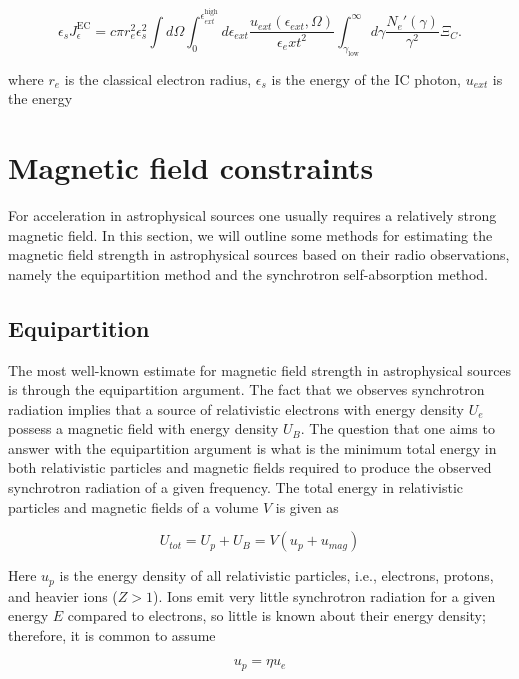\begin{equation}
    \epsilon_s J_{\epsilon}^{\text{EC}} = c \pi r_e^2 \epsilon_s^2 \int d\Omega \int_0^{\epsilon_{ext}^{\text{high}}} d\epsilon_{ext} \frac{u_{ext}(\epsilon_{ext}, \Omega)}{\epsilon{_ext}^2} \int_{\gamma_{\text{low}}}^{\infty} d\gamma \frac{N_e'(\gamma)}{\gamma^2} \Xi_C.
\end{equation}

where $r_e$ is the classical electron radius, $\epsilon_s$ is the energy of the IC photon, $u_{ext}$ is the energy

\section{Magnetic field constraints}
For acceleration in astrophysical sources one usually requires a relatively strong magnetic field. In this section, we will outline some methods for estimating the magnetic field strength in astrophysical sources based on their radio observations, namely the equipartition method and the synchrotron self-absorption method.

\subsection{Equipartition}
\label{sec:equipartition}
The most well-known estimate for magnetic field strength in astrophysical sources is through the equipartition argument. The fact that we observes synchrotron radiation implies that a source of relativistic electrons with energy density $U_e$ 
possess a magnetic field with energy density $U_B$. The question that one aims to answer with the equipartition argument is what is the minimum total energy in both relativistic particles and magnetic fields required to produce the observed synchrotron radiation of a given frequency. The total energy in relativistic particles and magnetic fields of a volume $V$ is given as

\begin{equation}
    U_{tot} = U_p + U_B = V(u_p + u_{mag})
\end{equation}

Here $u_p$ is the energy density of all relativistic particles, i.e., electrons, protons, and heavier ions ($Z>1$). Ions emit very little synchrotron radiation for a given energy $E$ compared to electrons, so little is known about their energy density; therefore, it is common to assume

\begin{equation}
    u_p = \eta u_e
\end{equation}

